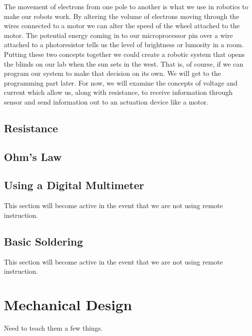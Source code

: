 \documentclass[
]{book}
\begin{document}
The movement of electrons from one pole to another is what we use in robotics to make our robots work. By altering the volume of electrons moving through the wires connected to a motor we can alter the speed of the wheel attached to the motor. The potential energy coming in to our microprocessor pin over a wire attached to a photoresistor tells us the level of brightness or lumosity in a room. Putting these two concepts together we could create a robotic system that opens the blinds on our lab when the sun sets in the west. That is, of course, if we can program our system to make that decision on its own. We will get to the programming part later. For now, we will examine the concepts of voltage and current which allow us, along with resistance, to receive information through sensor and send information out to an actuation device like a motor.

\hypertarget{resistance}{%
\section{Resistance}\label{resistance}}

\hypertarget{ohms-law}{%
\section{Ohm's Law}\label{ohms-law}}

\hypertarget{using-a-digital-multimeter}{%
\section{Using a Digital Multimeter}\label{using-a-digital-multimeter}}

This section will become active in the event that we are not using remote instruction.

\hypertarget{basic-soldering}{%
\section{Basic Soldering}\label{basic-soldering}}

This section will become active in the event that we are not using remote instruction.

\hypertarget{mechanical-design}{%
\chapter{Mechanical Design}\label{mechanical-design}}

Need to teach them a few things.
\end{document}
